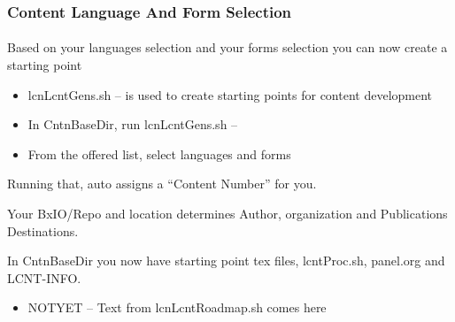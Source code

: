 \begin{comment}
*****  [[elisp:(org-cycle)][| ]]  [[elisp:(blee:ppmm:org-mode-toggle)][Nat]] [[elisp:(beginning-of-buffer)][Top]] [[elisp:(delete-other-windows)][(1)]] || /Frame/ *Label=ContentLanguageAndFormSelection*  Content Language And Form Selection ::  [[elisp:(org-cycle)][| ]]
\end{comment}

\begin{frame}[fragile,label=ContentLanguageAndFormSelection]
    \frametitle{Content Language And Form Selection}
    \framesubtitle{}

Based on your languages selection and your forms selection you can now create a starting point 
    
\begin{itemize}
\item lcnLcntGens.sh -- is used to create starting points for content development
\item In CntnBaseDir, run lcnLcntGens.sh -- 
\item From the offered list, select  languages and forms 
\end{itemize}

Running that, auto assigns a ``Content Number'' for you.

Your BxIO/Repo and location determines Author, organization and Publications Destinations.

In CntnBaseDir you now have starting point tex files, lcntProc.sh, panel.org and LCNT-INFO.

\begin{itemize}
\item NOTYET -- Text from lcnLcntRoadmap.sh comes here
\end{itemize}

\end{frame}


